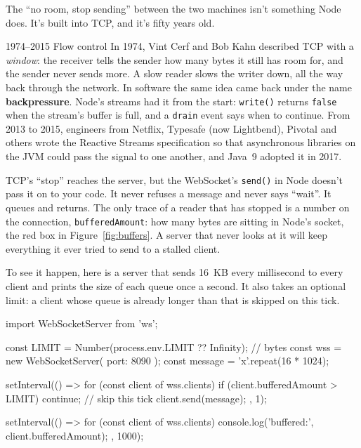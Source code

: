 The ``no room, stop sending'' between the two machines isn't something Node
does. It's built into TCP, and it's fifty years old.

\begin{history}{1974--2015 \textperiodcentered{} Flow control}
In 1974, Vint Cerf and Bob Kahn described TCP with a \emph{window}: the receiver
tells the sender how many bytes it still has room for, and the sender never
sends more. A slow reader slows the writer down, all the way back through the
network. In software the same idea came back under the name
\textbf{backpressure}. Node's streams had it from the start: \texttt{write()}
returns \texttt{false} when the stream's buffer is full, and a \texttt{drain}
event says when to continue. From 2013 to 2015, engineers from Netflix,
Typesafe (now Lightbend), Pivotal and others wrote the Reactive Streams specification so that
asynchronous libraries on the JVM could pass the signal to one another, and
Java~9 adopted it in 2017.
\end{history}

TCP's ``stop'' reaches the server, but the WebSocket's \texttt{send()} in Node
doesn't pass it on to your code. It never refuses a message and never says
``wait''. It queues and returns. The
only trace of a reader that has stopped is a number on the connection,
\texttt{bufferedAmount}: how many bytes are sitting in Node's socket, the red
box in Figure~\ref{fig:buffers}. A server that never looks at it will keep
everything it ever tried to send to a stalled client.

To see it happen, here is a server that sends 16~KB every millisecond to every
client and prints the size of each queue once a second. It also takes an
optional limit: a client whose queue is already longer than that is skipped on
this tick.

\begin{code}
import { WebSocketServer } from 'ws';

const LIMIT = Number(process.env.LIMIT ?? Infinity); // bytes
const wss = new WebSocketServer({ port: 8090 });
const message = 'x'.repeat(16 * 1024);

setInterval(() => {
  for (const client of wss.clients) {
    if (client.bufferedAmount > LIMIT) continue; // skip this tick
    client.send(message);
  }
}, 1);

setInterval(() => {
  for (const client of wss.clients) console.log('buffered:', client.bufferedAmount);
}, 1000);
\end{code}

